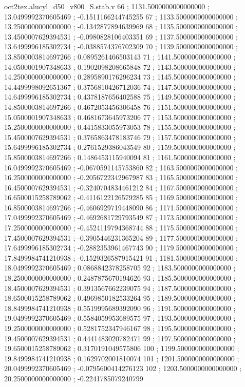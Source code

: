 \begin{filecontents}[overwrite]{oct2tex.alucyl_d50_v800_S.stab.v}
66 ; 1131.5000000000000000 ; 13.0499992370605469 ; -0.1511166244745255
67 ; 1133.5000000000000000 ; 13.2500000000000000 ; -0.1342877894639969
68 ; 1135.5000000000000000 ; 13.4500007629394531 ; -0.0980828106403351
69 ; 1137.5000000000000000 ; 13.6499996185302734 ; -0.0388574376702309
70 ; 1139.5000000000000000 ; 13.8500003814697266 ; 0.0895261466503143
71 ; 1141.5000000000000000 ; 14.0500001907348633 ; 0.1902098208665848
72 ; 1143.5000000000000000 ; 14.2500000000000000 ; 0.2895890176296234
73 ; 1145.5000000000000000 ; 14.4499998092651367 ; 0.3756810426712036
74 ; 1147.5000000000000000 ; 14.6499996185302734 ; 0.4378187656402588
75 ; 1149.5000000000000000 ; 14.8500003814697266 ; 0.4672053456306458
76 ; 1151.5000000000000000 ; 15.0500001907348633 ; 0.4681673645973206
77 ; 1153.5000000000000000 ; 15.2500000000000000 ; 0.4415833055973053
78 ; 1155.5000000000000000 ; 15.4500007629394531 ; 0.3765863478183746
79 ; 1157.5000000000000000 ; 15.6499996185302734 ; 0.2761529386043549
80 ; 1159.5000000000000000 ; 15.8500003814697266 ; 0.1486453115940094
81 ; 1161.5000000000000000 ; 16.0499992370605469 ; -0.0670591145753860
82 ; 1163.5000000000000000 ; 16.2500000000000000 ; -0.2056722342967987
83 ; 1165.5000000000000000 ; 16.4500007629394531 ; -0.3240704834461212
84 ; 1167.5000000000000000 ; 16.6500015258789062 ; -0.4116122126579285
85 ; 1169.5000000000000000 ; 16.8500003814697266 ; -0.4606929719448090
86 ; 1171.5000000000000000 ; 17.0499992370605469 ; -0.4692681729793549
87 ; 1173.5000000000000000 ; 17.2500000000000000 ; -0.4524119794368744
88 ; 1175.5000000000000000 ; 17.4500007629394531 ; -0.3905446231365204
89 ; 1177.5000000000000000 ; 17.6499996185302734 ; -0.2882353961467743
90 ; 1179.5000000000000000 ; 17.8499984741210938 ; -0.1529326587915421
91 ; 1181.5000000000000000 ; 18.0499992370605469 ; 0.0868842378258705
92 ; 1183.5000000000000000 ; 18.2500000000000000 ; 0.2487875670194626
93 ; 1185.5000000000000000 ; 18.4500007629394531 ; 0.3913567662239075
94 ; 1187.5000000000000000 ; 18.6500015258789062 ; 0.4969850182533264
95 ; 1189.5000000000000000 ; 18.8499984741210938 ; 0.5519995689392090
96 ; 1191.5000000000000000 ; 19.0499992370605469 ; 0.5584059953689575
97 ; 1193.5000000000000000 ; 19.2500000000000000 ; 0.5281752347946167
98 ; 1195.5000000000000000 ; 19.4500007629394531 ; 0.4441483020782471
99 ; 1197.5000000000000000 ; 19.6500015258789062 ; 0.3170191049575806
100 ; 1199.5000000000000000 ; 19.8499984741210938 ; 0.1629702001810074
101 ; 1201.5000000000000000 ; 20.0499992370605469 ; -0.0795600414276123
102 ; 1203.5000000000000000 ; 20.2500000000000000 ; -0.2241785079240799

\end{filecontents}
